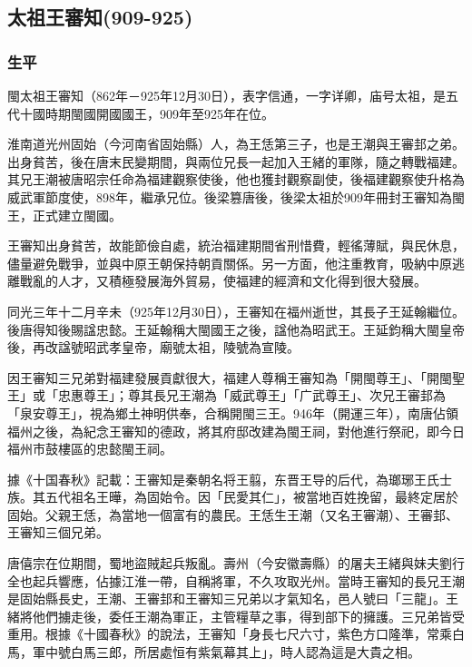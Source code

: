 
\subsection{太祖王審知\tiny(909-925)}

\subsubsection{生平}

閩太祖王審知（862年－925年12月30日），表字信通，一字详卿，庙号太祖，是五代十國時期閩國開國國王，909年至925年在位。

淮南道光州固始（今河南省固始縣）人，為王恁第三子，也是王潮與王審邽之弟。出身貧苦，後在唐末民變期間，與兩位兄長一起加入王緒的軍隊，隨之轉戰福建。其兄王潮被唐昭宗任命為福建觀察使後，他也獲封觀察副使，後福建觀察使升格為威武軍節度使，898年，繼承兄位。後梁篡唐後，後梁太祖於909年冊封王審知為閩王，正式建立閩國。

王審知出身貧苦，故能節儉自處，統治福建期間省刑惜費，輕徭薄賦，與民休息，儘量避免戰爭，並與中原王朝保持朝貢關係。另一方面，他注重教育，吸納中原逃離戰亂的人才，又積極發展海外貿易，使福建的經濟和文化得到很大發展。

同光三年十二月辛未（925年12月30日），王審知在福州逝世，其長子王延翰繼位。後唐得知後賜諡忠懿。王延翰稱大閩國王之後，諡他為昭武王。王延鈞稱大閩皇帝後，再改諡號昭武孝皇帝，廟號太祖，陵號為宣陵。

因王審知三兄弟對福建發展貢獻很大，福建人尊稱王審知為「開閩尊王」、「開閩聖王」或「忠惠尊王」；尊其長兄王潮為「威武尊王」「广武尊王」、次兄王審邽為「泉安尊王」，視為鄉土神明供奉，合稱開閩三王。946年（開運三年），南唐佔領福州之後，為紀念王審知的德政，將其府邸改建為閩王祠，對他進行祭祀，即今日福州市鼓樓區的忠懿閩王祠。

據《十国春秋》記載：王審知是秦朝名将王翦，东晋王导的后代，為瑯琊王氏士族。其五代祖名王曄，為固始令。因「民愛其仁」，被當地百姓挽留，最終定居於固始。父親王恁，為當地一個富有的農民。王恁生王潮（又名王審潮）、王審邽、王審知三個兄弟。

唐僖宗在位期間，蜀地盜賊起兵叛亂。壽州（今安徽壽縣）的屠夫王緒與妹夫劉行全也起兵響應，佔據江淮一帶，自稱將軍，不久攻取光州。當時王審知的長兄王潮是固始縣長史，王潮、王審邽和王審知三兄弟以才氣知名，邑人號曰「三龍」。王緒將他們擄走後，委任王潮為軍正，主管糧草之事，得到部下的擁護。三兄弟皆受重用。根據《十國春秋》的說法，王審知「身長七尺六寸，紫色方口隆準，常乘白馬，軍中號白馬三郎，所居處恒有紫氣幕其上」，時人認為這是大貴之相。

